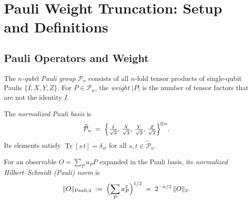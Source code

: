 %


\chapter{Pauli Weight Truncation: Setup and Definitions}

\section{Pauli Operators and Weight}

\begin{definition}
  \label{def:pauli-group}
  \leanok
  The \emph{$n$-qubit Pauli group} $\mathcal{P}_n$ consists of all $n$-fold tensor
  products of single-qubit Paulis $\{I, X, Y, Z\}$.  For $P \in \mathcal{P}_n$, the
  \emph{weight} $|P|$ is the number of tensor factors that are not the identity $I$.
\end{definition}

\begin{definition}
  \label{def:normalized-pauli-basis}
  \leanok
  The \emph{normalized Pauli basis} is
  \[
    \widetilde{\mathcal{P}}_n
    \;=\;
    \Bigl\{\tfrac{I}{\sqrt{2}},\, \tfrac{X}{\sqrt{2}},\, \tfrac{Y}{\sqrt{2}},\,
            \tfrac{Z}{\sqrt{2}}\Bigr\}^{\!\otimes n}.
  \]
  Its elements satisfy $\operatorname{Tr}[s\,t] = \delta_{st}$ for all
  $s, t \in \widetilde{\mathcal{P}}_n$.
\end{definition}

\begin{definition}
  \label{def:pauli-norm}
  \leanok
  For an observable $O = \sum_P a_P P$ expanded in the Pauli basis, its
  \emph{normalized Hilbert--Schmidt (Pauli) norm} is
  \[
    \|O\|_{\mathrm{Pauli},2}
    \;:=\;
    \Bigl(\sum_P a_P^2\Bigr)^{1/2}
    \;=\; 2^{-n/2}\,\|O\|_2.
  \]
\end{definition}

